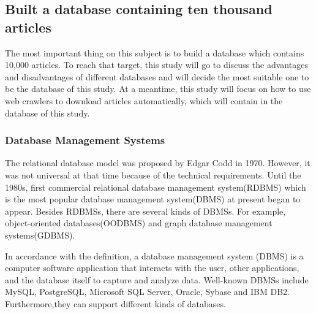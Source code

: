 	
\subsection{Built a database containing ten thousand articles}


The most important thing on this subject is to build a database which contains 10,000 articles.
To reach that target, this study will go to discuss the advantages and disadvantages of different databases and will decide the most suitable one to be the database of this study.
At a meantime, this study will focus on how to use web crawlers to download articles automatically, which will contain in the database of this study.



\subsubsection{Database Management Systems}

The relational database model was proposed by 
Edgar Codd in 1970. However, it was not universal
at that time because of the technical requirements. 
Until the 1980s, first commercial 
relational database management system(RDBMS)
which is the most popular database management 
system(DBMS) at present began to appear. 
Besides RDBMSs, there are several 
kinds of DBMSs. For example, object-oriented 
databases(OODBMS) and graph database management 
systems(GDBMS).

In accordance with the definition, a database management system (DBMS) is a computer software application that interacts with the user, other applications, and the database itself to capture and analyze data. Well-known DBMSs include MySQL, PostgreSQL, Microsoft SQL Server, Oracle, Sybase and IBM DB2. Furthermore,they can support different kinds of databases.

